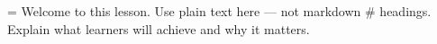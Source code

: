 \overviewmarkdown={
Welcome to this lesson. Use plain text here — not markdown # headings.
Explain what learners will achieve and why it matters.
}

